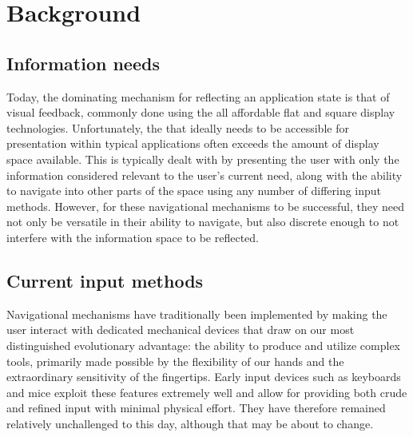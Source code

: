 \section{Background}
		  
\subsection{Information needs}

Today, the dominating mechanism for reflecting an application state is that of visual feedback, commonly done using the all affordable flat and square display technologies. Unfortunately, the  that ideally needs to be accessible for presentation within typical applications often exceeds the amount of display space available. This is typically dealt with by presenting the user with only the information considered relevant to the user's current need, along with the ability to navigate into other parts of the space using any number of differing input methods. However, for these navigational mechanisms to be successful, they need not only be versatile in their ability to navigate, but also discrete enough to not interfere with the information space to be reflected.

\subsection{Current input methods}

Navigational mechanisms have traditionally been implemented by making the user interact with dedicated mechanical devices that draw on our most distinguished evolutionary advantage: the ability to produce and utilize complex tools, primarily made possible by the flexibility of our hands and the extraordinary sensitivity of the fingertips. Early input devices such as keyboards and mice exploit these features extremely well and allow for providing both crude and refined input with minimal physical effort. They have therefore remained relatively unchallenged to this day, although that may be about to change.

